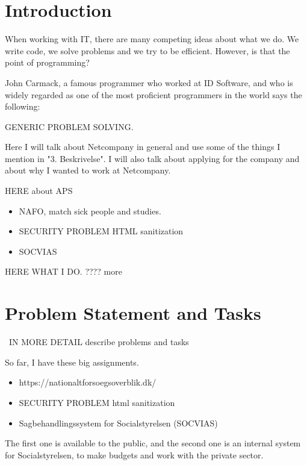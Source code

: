 \documentclass[../main.tex]{subfiles}
\begin{document}
\section{Introduction}

When working with IT, there are many competing ideas about what we do. We write
code, we solve problems and we try to be efficient. However, is that the point
of programming? 

John Carmack, a famous programmer who worked at ID Software, and who is  widely regarded
as one of the most proficient programmers in the world says the following:





GENERIC PROBLEM SOLVING.  

Here I will talk about Netcompany in general and use some of the things I mention in "3. Beskrivelse".
I will also talk about applying for the company and about why I wanted to work at Netcompany.  

HERE about APS 

\begin{itemize}
    \item NAFO, match sick people and studies. 
    \item SECURITY PROBLEM HTML sanitization
    \item SOCVIAS 
\end{itemize}
HERE WHAT I DO. 
    ???? more 


\section{Problem Statement and Tasks}
\
IN MORE DETAIL describe problems and tasks 

So far, I have these big assignments. 

\begin{itemize}
    \item  https://nationaltforsoegsoverblik.dk/ 
    \item SECURITY PROBLEM html sanitization 
    \item Sagbehandlingssystem for Socialstyrelsen (SOCVIAS) 
\end{itemize}

The first one is available to the public, and the second one is an internal system for Socialstyrelsen, to make budgets and work with the private sector. 
\end{document}
